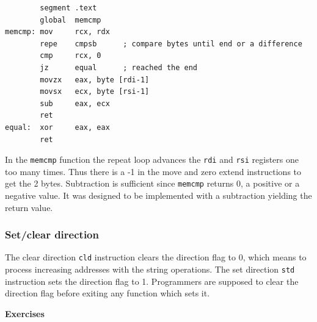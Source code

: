 \documentclass[11pt,b5paper]{book}
\begin{document}
\begin{verbatim}
        segment .text
        global  memcmp
memcmp: mov     rcx, rdx
        repe    cmpsb      ; compare bytes until end or a difference
        cmp     rcx, 0
        jz      equal      ; reached the end
        movzx   eax, byte [rdi-1]
        movsx   ecx, byte [rsi-1]
        sub     eax, ecx
        ret
equal:  xor     eax, eax
        ret

\end{verbatim}

In the {\tt memcmp} function the repeat loop advances the {\tt rdi} and {\tt rsi}
registers one too many times.
Thus there is a -1 in the move and zero extend instructions to get the 2 bytes.
Subtraction is sufficient since {\tt memcmp} returns 0, a positive or a negative value.
It was designed to be implemented with a subtraction yielding the return value.

\subsubsection{Set/clear direction}

The clear direction {\tt cld} instruction clears the direction flag to 0, which means  
to process increasing addresses with the string operations.
The set direction {\tt std} instruction sets the direction flag to 1.
Programmers are supposed to clear the direction flag before exiting any function which sets it.



\vfill
\break
{\bf\large Exercises}
\end{document}
